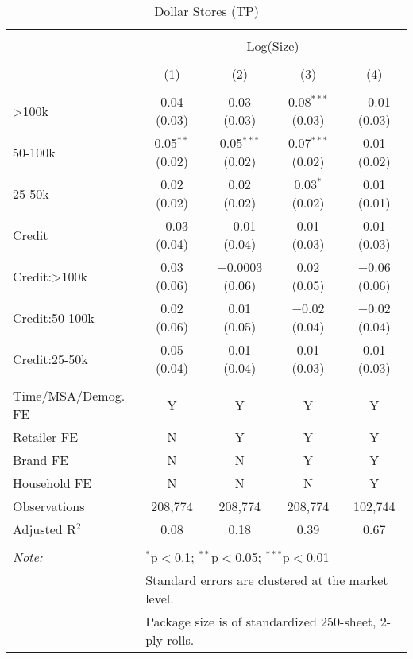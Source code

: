 
\begin{table}[!htbp] \centering 
  \caption{Dollar Stores (TP)} 
  \label{tab:packageSizeDollarLiq} 
\begin{tabular}{@{\extracolsep{5pt}}lcccc} 
\\[-1.8ex]\hline 
\hline \\[-1.8ex] 
 & \multicolumn{4}{c}{Log(Size)} \\ 
\\[-1.8ex] & (1) & (2) & (3) & (4)\\ 
\hline \\[-1.8ex] 
 >100k & 0.04 (0.03) & 0.03 (0.03) & 0.08$^{***}$ (0.03) & $-$0.01 (0.03) \\ 
  50-100k & 0.05$^{**}$ (0.02) & 0.05$^{***}$ (0.02) & 0.07$^{***}$ (0.02) & 0.01 (0.02) \\ 
  25-50k & 0.02 (0.02) & 0.02 (0.02) & 0.03$^{*}$ (0.02) & 0.01 (0.01) \\ 
  Credit & $-$0.03 (0.04) & $-$0.01 (0.04) & 0.01 (0.03) & 0.01 (0.03) \\ 
  Credit:>100k & 0.03 (0.06) & $-$0.0003 (0.06) & 0.02 (0.05) & $-$0.06 (0.06) \\ 
  Credit:50-100k & 0.02 (0.06) & 0.01 (0.05) & $-$0.02 (0.04) & $-$0.02 (0.04) \\ 
  Credit:25-50k & 0.05 (0.04) & 0.01 (0.04) & 0.01 (0.03) & 0.01 (0.03) \\ 
 \hline \\[-1.8ex] 
Time/MSA/Demog. FE & Y & Y & Y & Y \\ 
Retailer FE & N & Y & Y & Y \\ 
Brand FE & N & N & Y & Y \\ 
Household FE & N & N & N & Y \\ 
Observations & 208,774 & 208,774 & 208,774 & 102,744 \\ 
Adjusted R$^{2}$ & 0.08 & 0.18 & 0.39 & 0.67 \\ 
\hline 
\hline \\[-1.8ex] 
\textit{Note:}  & \multicolumn{4}{l}{$^{*}$p$<$0.1; $^{**}$p$<$0.05; $^{***}$p$<$0.01} \\ 
 & \multicolumn{4}{l}{Standard errors are clustered at the market level.} \\ 
 & \multicolumn{4}{l}{Package size is of standardized 250-sheet, 2-ply rolls.} \\ 
\end{tabular} 
\end{table} 
